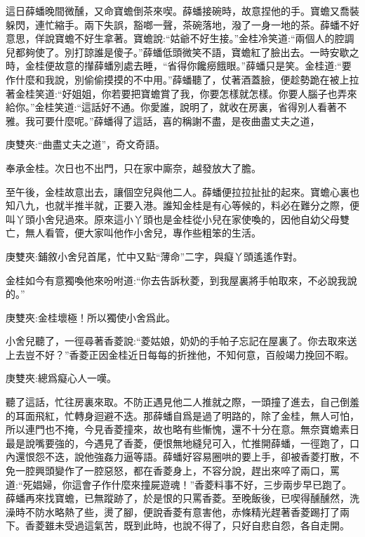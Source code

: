\begin{parag}
    這日薛蟠晚間微醺，又命寶蟾倒茶來喫。薛蟠接碗時，故意捏他的手。寶蟾又喬裝躲閃，連忙縮手。兩下失誤，豁啷一聲，茶碗落地，潑了一身一地的茶。薛蟠不好意思，佯說寶蟾不好生拿著。寶蟾說:“姑爺不好生接。”金桂冷笑道:“兩個人的腔調兒都夠使了。別打諒誰是傻子。”薛蟠低頭微笑不語，寶蟾紅了臉出去。一時安歇之時，金桂便故意的攆薛蟠別處去睡，“省得你饞癆餓眼。”薛蟠只是笑。金桂道:“要作什麼和我說，別偷偷摸摸的不中用。”薛蟠聽了，仗著酒蓋臉，便趁勢跪在被上拉著金桂笑道:“好姐姐，你若要把寶蟾賞了我，你要怎樣就怎樣。你要人腦子也弄來給你。”金桂笑道:“這話好不通。你愛誰，說明了，就收在房裏，省得別人看著不雅。我可要什麼呢。”薛蟠得了這話，喜的稱謝不盡，是夜曲盡丈夫之道，\begin{note}庚雙夾:“曲盡丈夫之道”，奇文奇語。\end{note}奉承金桂。次日也不出門，只在家中廝奈，越發放大了膽。
\end{parag}


\begin{parag}
    至午後，金桂故意出去，讓個空兒與他二人。薛蟠便拉拉扯扯的起來。寶蟾心裏也知八九，也就半推半就，正要入港。誰知金桂是有心等候的，料必在難分之際，便叫丫頭小舍兒過來。原來這小丫頭也是金桂從小兒在家使喚的，因他自幼父母雙亡，無人看管，便大家叫他作小舍兒，專作些粗笨的生活。\begin{note}庚雙夾:鋪敘小舍兒首尾，忙中又點“薄命”二字，與癡丫頭遙遙作對。\end{note}金桂如今有意獨喚他來吩咐道:“你去告訴秋菱，到我屋裏將手帕取來，不必說我說的。”\begin{note}庚雙夾:金桂壞極！所以獨使小舍爲此。\end{note}小舍兒聽了，一徑尋著香菱說:“菱姑娘，奶奶的手帕子忘記在屋裏了。你去取來送上去豈不好？”香菱正因金桂近日每每的折挫他，不知何意，百般竭力挽回不暇。\begin{note}庚雙夾:總爲癡心人一嘆。\end{note}聽了這話，忙往房裏來取。不防正遇見他二人推就之際，一頭撞了進去，自己倒羞的耳面飛紅，忙轉身迴避不迭。那薛蟠自爲是過了明路的，除了金桂，無人可怕，所以連門也不掩，今見香菱撞來，故也略有些慚愧，還不十分在意。無奈寶蟾素日最是說嘴要強的，今遇見了香菱，便恨無地縫兒可入，忙推開薛蟠，一徑跑了，口內還恨怨不迭，說他強姦力逼等語。薛蟠好容易圈哄的要上手，卻被香菱打散，不免一腔興頭變作了一腔惡怒，都在香菱身上，不容分說，趕出來啐了兩口，罵道:“死娼婦，你這會子作什麼來撞屍遊魂！”香菱料事不好，三步兩步早已跑了。薛蟠再來找寶蟾，已無蹤跡了，於是恨的只罵香菱。至晚飯後，已喫得醺醺然，洗澡時不防水略熱了些，燙了腳，便說香菱有意害他，赤條精光趕著香菱踢打了兩下。香菱雖未受過這氣苦，既到此時，也說不得了，只好自悲自怨，各自走開。
\end{parag}



